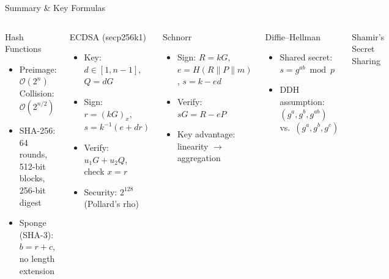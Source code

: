 \documentclass[8pt,aspectratio=169]{beamer}
\begin{document}
\begin{frame}{Summary \& Key Formulas}
\begin{columns}
\begin{block}{Hash Functions}
\scriptsize
\begin{itemize}
  \item Preimage: $\mathcal{O}(2^n)$ \quad Collision: $\mathcal{O}(2^{n/2})$
  \item SHA-256: 64 rounds, 512-bit blocks, 256-bit digest
  \item Sponge (SHA-3): $b = r + c$, no length extension
\end{itemize}
\end{block}
\vspace{1mm}
\begin{block}{ECDSA (secp256k1)}
\scriptsize
\begin{itemize}
  \item Key: $d \in [1,n\!-\!1]$, $Q = dG$
  \item Sign: $r = (kG)_x$, $s = k^{-1}(e + dr)$
  \item Verify: $u_1 G + u_2 Q$, check $x = r$
  \item Security: $2^{128}$ (Pollard's rho)
\end{itemize}
\end{block}
\vspace{1mm}
\begin{block}{Schnorr}
\scriptsize
\begin{itemize}
  \item Sign: $R = kG$, $e = H(R\|P\|m)$, $s = k - ed$
  \item Verify: $sG = R - eP$
  \item Key advantage: linearity $\to$ aggregation
\end{itemize}
\end{block}
\begin{block}{Diffie--Hellman}
\scriptsize
\begin{itemize}
  \item Shared secret: $s = g^{ab} \bmod p$
  \item DDH assumption: $(g^a, g^b, g^{ab})$ vs.\ $(g^a, g^b, g^c)$
\end{itemize}
\end{block}
\vspace{1mm}
\begin{block}{Shamir's Secret Sharing}
\scriptsize
\begin{itemize}

\end{itemize}
\end{block}
\end{columns}
\end{frame}
\end{document}
